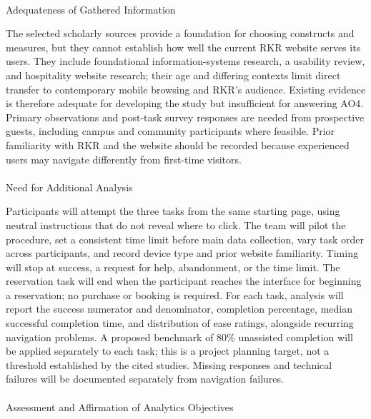 \documentclass[
  12pt,
  letterpaper,
  DIV=11,
  numbers=noendperiod]{scrartcl}
\makeatletter
\let\oldparagraph\paragraph
\renewcommand{\paragraph}{
    \@ifstar
      \xxxParagraphStar
      \xxxParagraphNoStar
  }
\newcommand{\xxxParagraphStar}[1]{\oldparagraph*{#1}\mbox{}}
\newcommand{\xxxParagraphNoStar}[1]{\oldparagraph{#1}\mbox{}}
\makeatother
\begin{document}
\paragraph{Adequateness of Gathered
Information}\label{adequateness-of-gathered-information-3}

The selected scholarly sources provide a foundation for choosing
constructs and measures, but they cannot establish how well the current
RKR website serves its users. They include foundational
information-systems research, a usability review, and hospitality
website research; their age and differing contexts limit direct transfer
to contemporary mobile browsing and RKR's audience. Existing evidence is
therefore adequate for developing the study but insufficient for
answering AO4. Primary observations and post-task survey responses are
needed from prospective guests, including campus and community
participants where feasible. Prior familiarity with RKR and the website
should be recorded because experienced users may navigate differently
from first-time visitors.

\paragraph{Need for Additional
Analysis}\label{need-for-additional-analysis-3}

Participants will attempt the three tasks from the same starting page,
using neutral instructions that do not reveal where to click. The team
will pilot the procedure, set a consistent time limit before main data
collection, vary task order across participants, and record device type
and prior website familiarity. Timing will stop at success, a request
for help, abandonment, or the time limit. The reservation task will end
when the participant reaches the interface for beginning a reservation;
no purchase or booking is required. For each task, analysis will report
the success numerator and denominator, completion percentage, median
successful completion time, and distribution of ease ratings, alongside
recurring navigation problems. A proposed benchmark of 80\% unassisted
completion will be applied separately to each task; this is a project
planning target, not a threshold established by the cited studies.
Missing responses and technical failures will be documented separately
from navigation failures.

\paragraph{Assessment and Affirmation of Analytics
Objectives}\label{assessment-and-affirmation-of-analytics-objectives-3}
\end{document}
